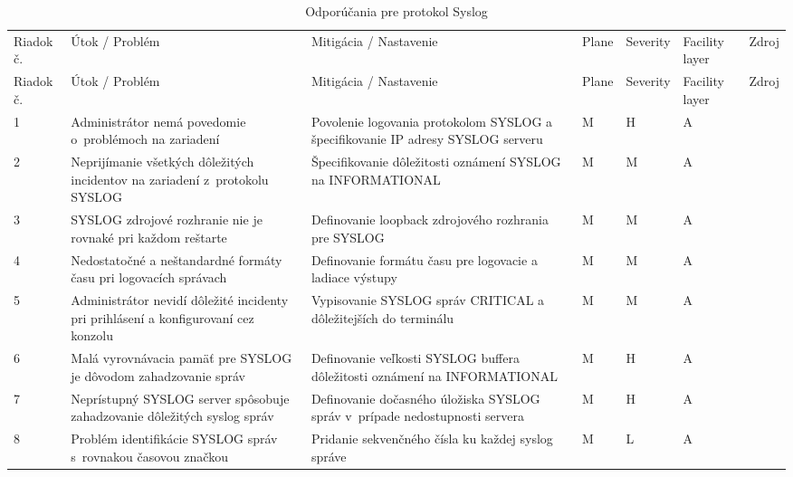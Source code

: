 \begin{longtable}[!htbp]{|C{2.5em}L{11em}L{11em}C{2.5em}C{4em}C{5em}L{2.5em}|}
	
	\caption{Odporúčania pre protokol Syslog}
	\label{tab:syslog}\\ \hline
	\mbox{Riadok} č.&Útok / Problém	&Mitigácia / Nastavenie	&Plane	&Severity	&Facility layer	&Zdroj\\ \hhline{=======}
	\endfirsthead 
	\hline
	\centering
	
	Riadok č.	&Útok / Problém	&Mitigácia / Nastavenie	&Plane	&Severity	&Facility layer	&Zdroj\\ \hhline{=======}
	\endhead
	
	 1	&Administrátor nemá povedomie o~problémoch na zariadení	&Povolenie logovania protokolom SYSLOG a špecifikovanie IP adresy SYSLOG serveru	&M	&H	&A	& \cite{CIS_DrTLsgXv24lxeIIM}
	
	\cite{Graesser2001}\\
	2	&Neprijímanie všetkých dôležitých incidentov na zariadení z~protokolu SYSLOG	&Špecifikovanie dôležitosti oznámení SYSLOG na INFORMATIONAL	&M	&M	&A	& \cite{CIS_DrTLsgXv24lxeIIM}\\
	 3	&SYSLOG zdrojové rozhranie nie je rovnaké pri každom reštarte	& Definovanie loopback zdrojového rozhrania pre SYSLOG	&M	&M	&A	& \cite{Singh2018}
	
	\cite{CIS_DrTLsgXv24lxeIIM}\\
	4	&Nedostatočné a neštandardné formáty času pri logovacích správach	&Definovanie formátu času pre logovacie a ladiace výstupy	&M	&M	&A	& \cite{CIS_DrTLsgXv24lxeIIM}
	
	\cite{Graesser2001}\\
	 5	&Administrátor nevidí dôležité incidenty pri prihlásení a konfigurovaní cez konzolu	&Vypisovanie SYSLOG správ CRITICAL a dôležitejších do terminálu	&M	&M	&A	& \cite{Singh2018}
	
	\cite{CIS_DrTLsgXv24lxeIIM}\\
	6	&Malá vyrovnávacia pamäť pre SYSLOG je dôvodom zahadzovanie správ	&Definovanie veľkosti SYSLOG buffera dôležitosti oznámení na INFORMATIONAL	&M	&H	&A	& \cite{Singh2018}\\
	 7	&Neprístupný SYSLOG server spôsobuje zahadzovanie dôležitých syslog správ	&Definovanie dočasného úložiska SYSLOG správ v~prípade nedostupnosti servera	&M	&H	&A	& \cite{Singh2018}\\
	8	&Problém identifikácie SYSLOG správ s~rovnakou časovou značkou	&Pridanie sekvenčného čísla ku každej syslog správe	&M	&L	&A	& \cite{Akin2002}\\
	
	\hline
\end{longtable}%

